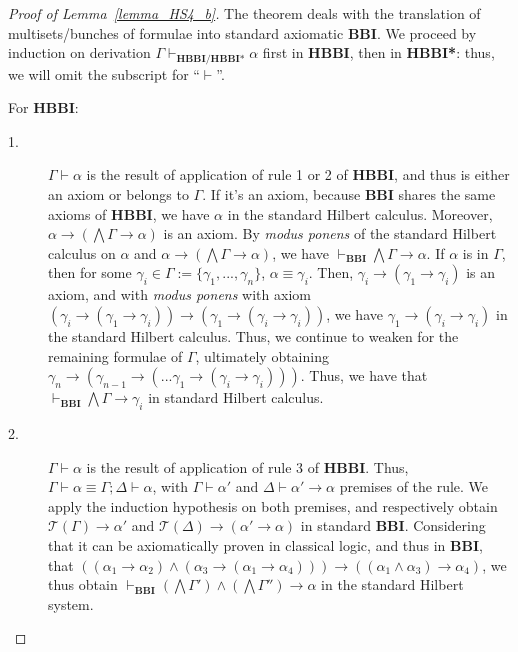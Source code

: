 \documentclass[a4paper]{article}
\newcommand{\BBI}{\textbf{BBI}\xspace}
\begin{document}
\begin{proof}[Proof of Lemma~\ref{lemma_HS4_b}]
The theorem deals with the translation of multisets/bunches of formulae into standard axiomatic \BBI. We proceed by induction on derivation $\Gamma \vdash_{\textbf{HBBI}/\textbf{HBBI*}} \alpha$ first in \textbf{HBBI}, then in \textbf{HBBI*}: thus, we will omit the subscript for “$\vdash$''.

    \item[] For \textbf{HBBI}:

\begin{description}
    

    \item[1.] $\Gamma \vdash \alpha$ is the result of application of rule 1 or 2 of \textbf{HBBI}, and thus is either an axiom or belongs to $\Gamma$. If it's an axiom, because \BBI shares the same axioms of \textbf{HBBI}, we have $\alpha$ in the standard Hilbert calculus. Moreover, $\alpha \rightarrow (\bigwedge \Gamma \rightarrow \alpha)$ is an axiom. By \textit{modus ponens} of the standard Hilbert calculus on $\alpha$ and $\alpha \rightarrow (\bigwedge \Gamma \rightarrow \alpha)$, we have $\vdash_{\BBI}\bigwedge \Gamma \rightarrow \alpha$. If $\alpha$ is in $\Gamma$, then for some $\gamma_i \in \Gamma:=\{\gamma_1, ..., \gamma_n\}$, $\alpha\equiv \gamma_i$. Then, $\gamma_i \rightarrow (\gamma_1 \rightarrow \gamma_i)$ is an axiom, and with \textit{modus ponens} with axiom $(\gamma_i \rightarrow (\gamma_1 \rightarrow \gamma_i)) \rightarrow (\gamma_1 \rightarrow (\gamma_i \rightarrow \gamma_i))$, we have $\gamma_1 \rightarrow (\gamma_i \rightarrow \gamma_i)$ in the standard Hilbert calculus. Thus, we continue to weaken for the remaining formulae of $\Gamma$, ultimately obtaining $\gamma_n \rightarrow(\gamma_{n-1}\rightarrow (... \gamma_1 \rightarrow (\gamma_i \rightarrow \gamma_i)))$. Thus, we have that $\vdash_{\BBI} \bigwedge \Gamma \rightarrow \gamma_i$ in standard Hilbert calculus.
    
    

    \item[2.] $\Gamma \vdash \alpha$ is the result of application of rule 3 of \textbf{HBBI}. Thus, $\Gamma \vdash \alpha \equiv \Gamma; \Delta \vdash \alpha$, with $\Gamma \vdash \alpha'$ and $\Delta \vdash \alpha' \rightarrow \alpha$ premises of the rule.  We apply the induction hypothesis on both premises, and respectively obtain $\mathcal{T}(\Gamma) \rightarrow \alpha'$ and $\mathcal{T}(\Delta)\rightarrow(\alpha' \rightarrow \alpha)$ in standard \BBI. Considering that it can be axiomatically proven in classical logic, and thus in \BBI, that $((\alpha_1 \rightarrow \alpha_2)\land (\alpha_3 \rightarrow (\alpha_1 \rightarrow \alpha_4))) \rightarrow ((\alpha_1 \land \alpha_3) \rightarrow \alpha_4)$, we thus obtain $\vdash_{\BBI}(\bigwedge \Gamma') \land (\bigwedge \Gamma'') \rightarrow \alpha$ in the standard Hilbert system.
    



\end{description}
\end{proof}
\end{document}
